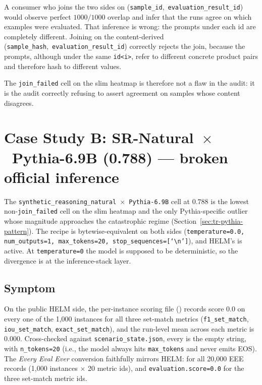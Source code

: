\documentclass[11pt]{article}
\newcommand{\eee}{\textit{Every Eval Ever}\xspace}
\begin{document}
A consumer who joins the two sides on
  \mbox{(\texttt{sample\_id}, \texttt{evaluation\_result\_id})} would
  observe perfect $1000/1000$ overlap and infer that the runs agree
  on which examples were evaluated.
That inference is wrong: the prompts under each id are completely
  different.
Joining on the content-derived
  \mbox{(\texttt{sample\_hash}, \texttt{evaluation\_result\_id})}
  correctly rejects the join, because the prompts, although under the
  same \texttt{id<i>}, refer to different concrete product pairs and
  therefore hash to different values.

The \texttt{join\_failed} cell on the slim heatmap is therefore not a
  flaw in the audit: it is the audit correctly refusing to assert
  agreement on samples whose content disagrees.


\section{Case Study B: \texorpdfstring{SR-Natural~$\times$~Pythia-6.9B}{SR-Natural x Pythia-6.9B} (0.788) --- broken official inference}
\label{sec:tr-case-b}

The \texttt{synthetic\_reasoning\_natural~$\times$~Pythia-6.9B} cell at
  $0.788$ is the lowest non-\texttt{join\_failed} cell on the slim
  heatmap and the only Pythia-specific outlier whose magnitude
  approaches the catastrophic regime
  (Section~\ref{sec:tr-pythia-pattern}).
The recipe is bytewise-equivalent on both sides
  (\texttt{temperature=0.0, num\_outputs=1, max\_tokens=20,
  stop\_sequences=[`\textbackslash n']}), and HELM's
   is active.
At \texttt{temperature=0} the model is supposed to be deterministic,
  so the divergence is at the inference-stack layer.

\subsection{Symptom}
\label{sec:tr-case-b-symptom}

On the public HELM side, the per-instance scoring file
  () records score $0.0$ on every one
  of the 1{,}000 instances for all three set-match metrics
  (\texttt{f1\_set\_match}, \texttt{iou\_set\_match},
  \texttt{exact\_set\_match}), and the run-level mean across each
  metric is $0.000$.
Cross-checked against \texttt{scenario\_state.json}, every
   is the empty
  string, with \texttt{n\_tokens=20} (i.e., the model always hits
  \texttt{max\_tokens} and never emits EOS).
The \eee{} conversion faithfully mirrors HELM:
   for all 20{,}000
  EEE records (1{,}000 instances $\times$ 20 metric ids), and
  \texttt{evaluation.score=0.0} for the three set-match metric ids.
\end{document}
